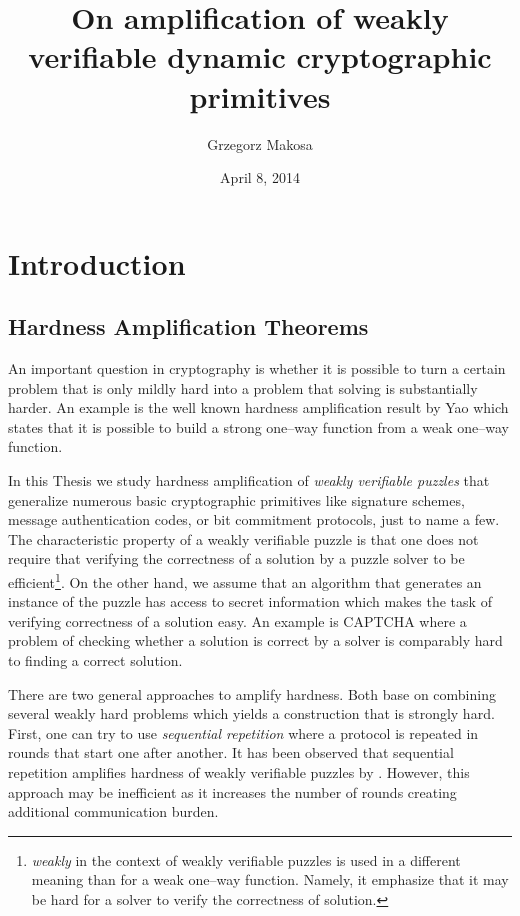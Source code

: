 \documentclass[11pt,a4paper,titlepage]{memoir}
\title{On amplification of weakly verifiable dynamic cryptographic primitives}
\author{Grzegorz Makosa}
\date{April 8, 2014}
\begin{document}
\frontmatter

%

\cleartorecto
\tableofcontents
\mainmatter

\chapter{Introduction}
\section{Hardness Amplification Theorems}
An important question in cryptography is whether it is possible to turn a certain problem
that is only mildly hard into a problem that solving is substantially harder.
An example is the well known hardness amplification result by Yao \cite{Goldreich:2000:FCB:519078}
which states that it is possible to build a strong one--way function from a weak one--way function.

In this Thesis we study hardness amplification of \textit{weakly verifiable puzzles} that
generalize numerous basic cryptographic primitives like signature schemes,
message authentication codes, or bit commitment protocols, just to name a few.
The characteristic property of a weakly verifiable puzzle is that one does not require that verifying the correctness of a solution
by a puzzle solver to be efficient\footnote{\textit{weakly} in the context of weakly verifiable puzzles is used in a different meaning than for a weak one--way function.
Namely, it emphasize that it may be hard for a solver to verify the correctness of solution.}.
On the other hand, we assume that an algorithm that generates an instance of the puzzle has access to secret information which makes the task of verifying correctness of a solution easy.
An example is CAPTCHA where a problem of checking whether a solution is correct by a solver is comparably hard to finding a correct solution.

There are two general approaches to amplify hardness. Both base on combining several weakly hard problems which yields
a construction that is strongly hard. First, one can try to use \textit{sequential repetition} where a protocol is repeated
in rounds that start one after another. It has been observed that sequential repetition amplifies hardness
of weakly verifiable puzzles by \cite{von2003captcha}. However, this approach may be inefficient as it increases
the number of rounds creating additional communication burden.
\end{document}
